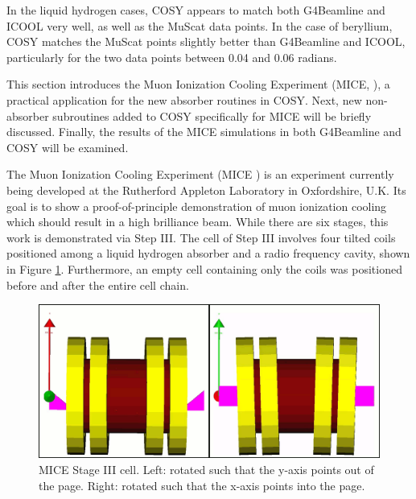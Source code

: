 In the liquid hydrogen cases, COSY appears to match both G4Beamline and ICOOL very well, as well as the MuScat data points. In the case of beryllium, COSY matches the MuScat points slightly better than G4Beamline and ICOOL, particularly for the two data points between 0.04 and 0.06 radians.

\label{sec:mice}

This section introduces the Muon Ionization Cooling Experiment (MICE, \cite{mice}), a practical application for the new absorber routines in COSY. Next, new non-absorber subroutines added to COSY specifically for MICE will be briefly discussed. Finally, the results of the MICE simulations in both G4Beamline and COSY will be examined.

\label{ssc:miceIntro}

The Muon Ionization Cooling Experiment (MICE \cite{mice}) is an experiment currently being developed at the Rutherford Appleton Laboratory in Oxfordshire, U.K. Its goal is to show a proof-of-principle demonstration of muon ionization cooling which should result in a high brilliance beam. While there are six stages, this work is demonstrated via Step III. The cell of Step III involves four tilted coils positioned among a liquid hydrogen absorber and a radio frequency cavity, shown in Figure \ref{fig:miceStageIII}. Furthermore, an empty cell containing only the coils was positioned before and after the entire cell chain.

\begin{figure}[h!]
  \centering
    \includegraphics[width=\textwidth]{Figures/miceStageIII} 
  \caption{MICE Stage III cell. Left: rotated such that the y-axis points out of the page. Right: rotated such that the x-axis points into the page.}
  \label{fig:miceStageIII}
\end{figure}


